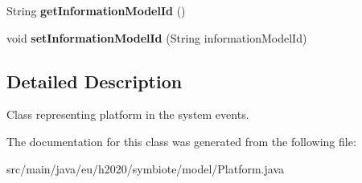 \begin{DoxyCompactItemize}
\item 
String {\bfseries get\+Information\+Model\+Id} ()\hypertarget{classeu_1_1h2020_1_1symbiote_1_1model_1_1Platform_a799a5bb8e0665457c4b8bfd2b34c9b3c}{}\label{classeu_1_1h2020_1_1symbiote_1_1model_1_1Platform_a799a5bb8e0665457c4b8bfd2b34c9b3c}

\item 
void {\bfseries set\+Information\+Model\+Id} (String information\+Model\+Id)\hypertarget{classeu_1_1h2020_1_1symbiote_1_1model_1_1Platform_ae3e1cb93bcb289d575f215990d7e9499}{}\label{classeu_1_1h2020_1_1symbiote_1_1model_1_1Platform_ae3e1cb93bcb289d575f215990d7e9499}

\end{DoxyCompactItemize}


\subsection{Detailed Description}
Class representing platform in the system events. 

The documentation for this class was generated from the following file\+:\begin{DoxyCompactItemize}
\item 
src/main/java/eu/h2020/symbiote/model/Platform.\+java\end{DoxyCompactItemize}
